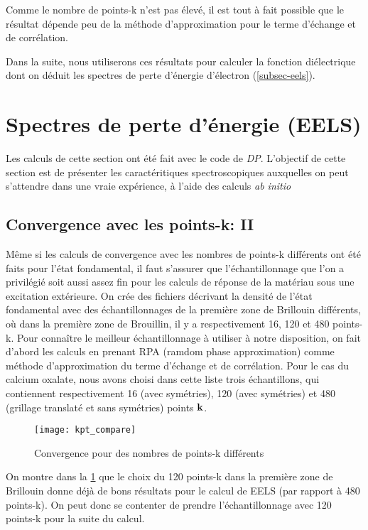Comme le nombre de points-k n'est pas élevé,
il est tout à fait possible que le résultat dépende peu de la méthode d'approximation
pour le terme d'échange et de corrélation.

Dans la suite, nous utiliserons ces résultats pour calculer la fonction diélectrique
dont on déduit les spectres de perte d'énergie d'électron (\cref{subsec-eels}).
\section{Spectres de perte d'énergie (EELS)}
Les calculs de cette section ont été fait avec le code de \textit{DP}.
L'objectif de cette section est de présenter les caractéritiques spectroscopiques
auxquelles on peut s'attendre dans une vraie expérience,
à l'aide des calculs \textit{ab initio}
\subsection{Convergence avec les points-k: II}


Même si les calculs de convergence avec les nombres de points-k différents ont été faits pour l'état fondamental,
il faut s'assurer que l'échantillonnage que l'on a privilégié soit aussi assez fin pour les calculs de réponse de la matériau sous une excitation extérieure.
On crée des fichiers décrivant la densité de l'état fondamental avec des échantillonnages
de la première zone de Brillouin différents,
où dans la première zone de Brouillin, il y a respectivement 16, 120 et 480 points-k.
Pour connaître le meilleur échantillonnage à utiliser à notre disposition,
on fait d'abord les calculs en prenant RPA (ramdom phase approximation)
comme méthode d'approximation du terme d'échange et de corrélation.
Pour le cas du calcium oxalate, nous avons choisi dans cette liste trois échantillons,
qui contiennent respectivement 16 (avec symétries),
120 (avec symétries) et 480 (grillage translaté et sans symétries) points $\vb{k}$.

\begin{figure}[!h]\label{kptCompare}
    \centering
    \texttt{[image: kpt\_compare]}
    \caption{Convergence pour des nombres de points-k différents}
\end{figure}

On montre dans la \cref{kptCompare} que le choix du 120 points-k dans la première zone de Brillouin
donne déjà de bons résultats pour le calcul de EELS (par rapport à 480 points-k).
On peut donc se contenter de prendre l'échantillonnage avec 120 points-k pour la suite du calcul.

